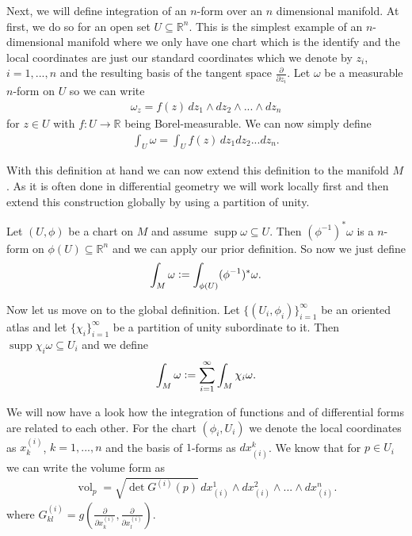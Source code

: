 \documentclass[12pt,a4paper]{article}
\numberwithin{equation}{subsection}
\numberwithin{lemma}{subsection}
\theoremstyle{definition}
\DeclareMathOperator{\supp}{supp}
\DeclareMathOperator{\vol}{vol}
\newcommand{\real}{\mathbb{R}}
\begin{document}
Next, we will define integration of an $n$-form over an $n$ dimensional 
manifold. At first, we do so for an open set $U \subseteq \real^n$.
This is the simplest example of an $n$-dimensional manifold where 
we only have one chart which is the identify and the local coordinates are 
just our standard coordinates which we denote by $z_i$, $i=1,...,n$ and the 
resulting basis of the tangent space $\frac{\partial}{\partial z_i}$. 
Let $\omega$ be a measurable 
$n$-form on $U$ so we can 
write 
\begin{align*}
    \omega_z = f(z)\, dz_1 \wedge dz_2 \wedge ... \wedge dz_n
\end{align*}
for $z \in U$ with $f:U \rightarrow \real$ being Borel-measurable. 
We can now simply define 
\begin{align*}
    \int_U \omega = \int_U f(z) \, dz_1 dz_2 ... dz_n.
\end{align*}

With this definition at hand we can now extend this definition to 
the manifold $M$. As it is often done in 
differential geometry we will work locally first and then extend this 
construction globally by using a partition of unity.

Let $(U,\phi)$ be a chart on $M$ and assume $\supp \omega \subseteq U$. 
Then $(\phi^{-1})^* \omega$
is a $n$-form on $\phi(U) \subseteq \real^n$ and 
we can apply our prior definition. So now we just define 
\begin{align*}
    \int_M \omega \vcentcolon= \int_{\phi(U)} (\phi^{-1})^* \omega.
\end{align*}

Now let us move on to the global definition. Let $\{(U_i,\phi_i)\}_{i=1}^\infty$
be an oriented atlas and let $\{ \chi_i \}_{i=1}^\infty$ be a partition 
of unity subordinate to it. 
Then $\supp \chi_i \omega \subseteq U_i$ 
and we define 
\begin{align*}
    \int_M \omega \vcentcolon= \sum_{i=1}^\infty \int_M \chi_i \omega.
\end{align*} 

We will now have a look how the integration of functions and of 
differential forms are related to each other. 
For the chart $(\phi_i, U_i)$ we denote the local coordinates as 
$x^{(i)}_k$, $k=1,...,n$ and the basis of $1$-forms as $dx_{(i)}^k$.
We know that for $p \in U_i$ we can write the volume form as
\begin{align*}
    \vol_p = \sqrt{ \det G^{(i)}(p)} \,
        dx_{(i)}^1 \wedge dx_{(i)}^2 \wedge ... \wedge dx_{(i)}^n.
\end{align*}
where $G^(i)_{kl} = g(\frac{\partial}{\partial x^{(i)}_k},\frac{\partial}{\partial x^{(i)}_l} )$.
\end{document}
